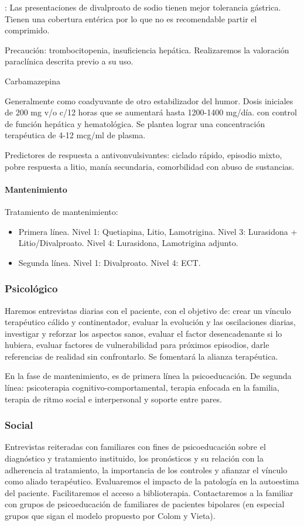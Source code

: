 \documentclass{scrbook}
\begin{document}
\faExclamationTriangle : Las presentaciones de divalproato de sodio tienen mejor tolerancia gástrica. Tienen una cobertura entérica por lo que no es recomendable partir el comprimido.

Precaución: trombocitopenia, insuficiencia hepática. Realizaremos la valoración paraclínica descrita previo a su uso.

\faPills Carbamazepina

Generalmente como coadyuvante de otro estabilizador del humor. Dosis iniciales de 200 mg v/o c/12 horas que se aumentará hasta 1200-1400 mg/día. con control de función hepática y hematológica. Se plantea lograr una concentración terapéutica de 4-12 mcg/ml de plasma.

\faLightbulb Predictores de respuesta a antivonvulsivantes: ciclado rápido, episodio mixto, pobre respuesta a litio, manía secundaria, comorbilidad con abuso de sustancias.
\paragraph{Mantenimiento}
Tratamiento de mantenimiento:
\begin{itemize}
	\item Primera línea. Nivel 1: Quetiapina, Litio, Lamotrigina. Nivel 3: Lurasidona + Litio/Divalproato. Nivel 4: Lurasidona, Lamotrigina adjunto.
	\item Segunda línea. Nivel 1: Divalproato. Nivel 4: ECT.
\end{itemize}
\subsubsection*{Psicológico}
Haremos entrevistas diarias con el paciente, con el objetivo de: crear un vínculo terapéutico cálido y continentador, evaluar la evolución y las oscilaciones diarias, investigar y reforzar los aspectos sanos, evaluar el factor desencadenante si lo hubiera, evaluar factores de vulnerabilidad para próximos episodios, darle referencias de realidad sin confrontarlo. Se fomentará la alianza terapéutica.

En la fase de mantenimiento, es de primera línea la psicoeducación. De segunda línea: psicoterapia cognitivo-comportamental, terapia enfocada en la familia, terapia de ritmo social e interpersonal y soporte entre pares\cite{yatham2018canadian}.

\subsubsection*{Social}
Entrevistas reiteradas con familiares con fines de psicoeducación sobre el diagnóstico y tratamiento instituido, los pronósticos y su relación con la adherencia al tratamiento, la importancia de los controles y afianzar el vínculo como aliado terapéutico. Evaluaremos el impacto de la patología en la autoestima del paciente. Facilitaremos el acceso a biblioterapia. Contactaremos a la familiar con grupos de psicoeducación de familiares de pacientes bipolares (en especial grupos que sigan el modelo propuesto por Colom y Vieta).
\end{document}
